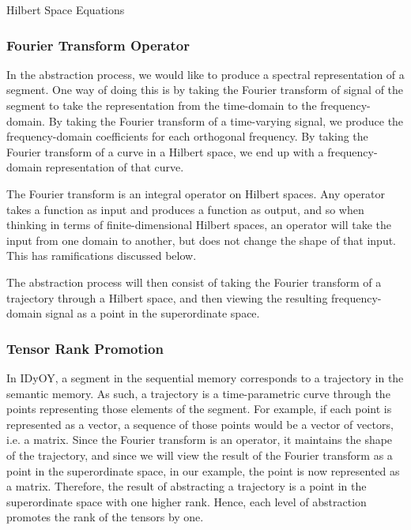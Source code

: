 \documentclass[runningheads]{llncs}
\begin{document}
Hilbert Space Equations

\subsubsection{Fourier Transform Operator}
In the abstraction process, we would like to produce a spectral representation of a segment.  One way of doing this is by taking the Fourier transform of signal of the segment to take the representation from the time-domain to the frequency-domain.  By taking the Fourier transform of a time-varying signal, we produce the frequency-domain coefficients for each orthogonal frequency.  By taking the Fourier transform of a curve in a Hilbert space, we end up with a frequency-domain representation of that curve.

The Fourier transform is an integral operator on Hilbert spaces.  Any operator takes a function as input and produces a function as output, and so when thinking in terms of finite-dimensional Hilbert spaces, an operator will take the input from one domain to another, but does not change the shape of that input.  This has ramifications discussed below.

The abstraction process will then consist of taking the Fourier transform of a trajectory through a Hilbert space, and then viewing the resulting frequency-domain signal as a point in the superordinate space.

\subsubsection{Tensor Rank Promotion}

In IDyOY, a segment in the sequential memory corresponds to a trajectory in the semantic memory.  As such, a trajectory is a time-parametric curve through the points representing those elements of the segment.  For example, if each point is represented as a vector, a sequence of those points would be a vector of vectors, i.e. a matrix.  Since the Fourier transform is an operator, it maintains the shape of the trajectory, and since we will view the result of the Fourier transform as a point in the superordinate space, in our example, the point is now represented as a matrix.  Therefore, the result of abstracting a trajectory is a point in the superordinate space with one higher rank.  Hence, each level of abstraction promotes the rank of the tensors by one.  
\end{document}
